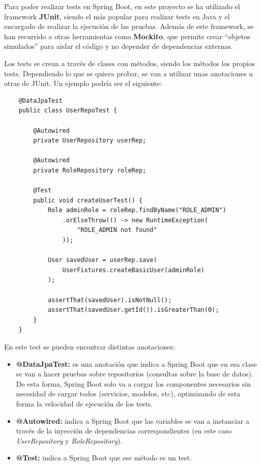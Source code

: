 Para poder realizar tests en Spring Boot, en este proyecto se ha utilizado el framework \textbf{JUnit}, siendo el más popular para realizar tests en Java y el encargado de realizar la ejecución de las pruebas.
Además de este framework, se han recurrido a otras herramientas como \textbf{Mockito}, que permite crear ``objetos simulados'' para aislar el código y no depender de dependencias externas.

Los tests se crean a través de clases con métodos, siendo los métodos los propios tests. Dependiendo lo que se quiera probar, se van a utilizar unas anotaciones u otras de JUnit. Un ejemplo podría ser el siguiente:

\begin{verbatim}
    @DataJpaTest
    public class UserRepoTest {

        @Autowired
        private UserRepository userRep;

        @Autowired
        private RoleRepository roleRep;

        @Test
        public void createUserTest() {
            Role adminRole = roleRep.findByName("ROLE_ADMIN")
                .orElseThrow(() -> new RuntimeException(
                    "ROLE_ADMIN not found"
                ));

            User savedUser = userRep.save(
                UserFixtures.createBasicUser(adminRole)
            );

            assertThat(savedUser).isNotNull();
            assertThat(savedUser.getId()).isGreaterThan(0);
        }
    }
\end{verbatim}

En este test se pueden encontrar distintas anotaciones:

\begin{itemize}
    \item \textbf{@DataJpaTest:} es una anotación que indica a Spring Boot que en esa clase se van a hacer pruebas sobre repositorios (consultas sobre la base de datos). De esta forma, Spring Boot solo va a cargar 
    los componentes necesarios sin necesidad de cargar todos (servicios, modelos, etc), optimizando de esta forma la velocidad de ejecución de los tests.

    \item \textbf{@Autowired:} indica a Spring Boot que las variables se van a instanciar a través de la inyección de dependencias correspondientes (en este caso \textit{UserRepository} y \textit{RoleRepository}).
    
    \item \textbf{@Test:} indica a Spring Boot que ese método es un test.
\end{itemize}

